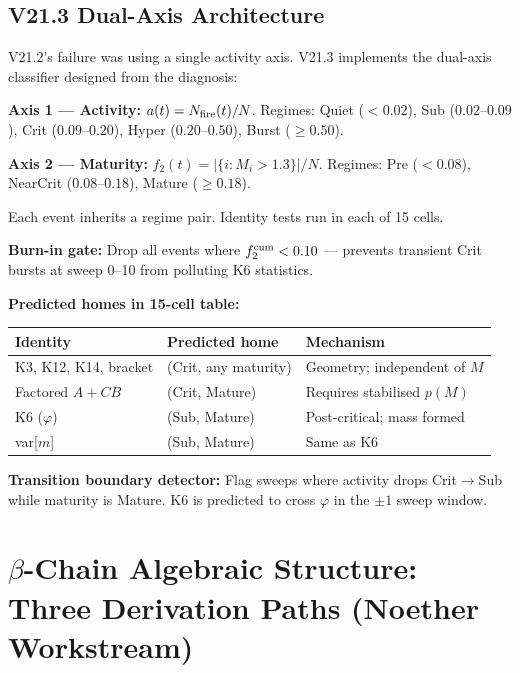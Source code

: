 \documentclass[12pt, a4paper]{article}
\begin{document}
\subsection{V21.3 Dual-Axis Architecture}

V21.2's failure was using a single activity axis. V21.3 implements the dual-axis classifier designed from the diagnosis:

\begin{formalbox}[title={Dual-Axis Classifier (V21.3 Architecture)}]
\textbf{Axis 1 --- Activity:} $a(t) = N_{\rm fire}(t)/N$. Regimes: Quiet ($<0.02$), Sub ($0.02$--$0.09$), Crit ($0.09$--$0.20$), Hyper ($0.20$--$0.50$), Burst ($\geq 0.50$).

\textbf{Axis 2 --- Maturity:} $f_2(t) = |\{i: M_i > 1.3\}|/N$. Regimes: Pre ($<0.08$), NearCrit ($0.08$--$0.18$), Mature ($\geq 0.18$).

Each event inherits a regime pair. Identity tests run in each of 15 cells.

\textbf{Burn-in gate:} Drop all events where $f_2^{\rm cum} < 0.10$ --- prevents transient Crit bursts at sweep 0--10 from polluting K6 statistics.

\textbf{Predicted homes in 15-cell table:}
\begin{center}
\begin{tabular}{p{4.5cm} p{3cm} p{4cm}}
\toprule
Identity & Predicted home & Mechanism \\
\midrule
K3, K12, K14, bracket & (Crit, any maturity) & Geometry; independent of $M$ \\
Factored $A+CB$ & (Crit, Mature) & Requires stabilised $p(M)$ \\
K6 ($\varphi$) & (Sub, Mature) & Post-critical; mass formed \\
var[$m$] & (Sub, Mature) & Same as K6 \\
\bottomrule
\end{tabular}
\end{center}

\textbf{Transition boundary detector:} Flag sweeps where activity drops Crit$\to$Sub while maturity is Mature. K6 is predicted to cross $\varphi$ in the $\pm 1$ sweep window.
\end{formalbox}

\section[$\beta$-Chain Algebraic Structure: Three Derivation Paths]{$\beta$-Chain Algebraic Structure:\\Three Derivation Paths (Noether Workstream)}
\end{document}

